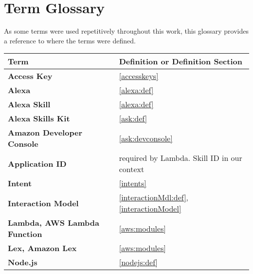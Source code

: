 \newpage
\section*{Term Glossary}
%

As some terms were used repetitively throughout this work, this glossary provides a reference to where the terms were defined.
\begin{flushleft}
\begin{tabular}{ll}
\textbf{Term} & Definition or Definition Section \\ \hline
\textbf{Access Key}			&	 	\ref{accesskeys}\\


\textbf{Alexa}				&		\ref{alexa:def}\\
\textbf{Alexa Skill}		&		\ref{alexa:def}\\
\textbf{Alexa Skills Kit}	&		\ref{ask:def}\\
\textbf{Amazon Developer Console}&	\ref{ask:devconsole}\\

\textbf{Application ID}		&	required by Lambda. Skill ID in our context\\



\textbf{Intent}				&		\ref{intents}\\
\textbf{Interaction Model}	&		\ref{interactionMdl:def}, \ref{interactionModel}\\



\textbf{Lambda, AWS Lambda Function}	&		\ref{aws:modules}\\
\textbf{Lex, Amazon Lex}	&		\ref{aws:modules}\\

\textbf{Node.js}			&		\ref{nodejs:def}\\





\end{tabular}
\end{flushleft}
